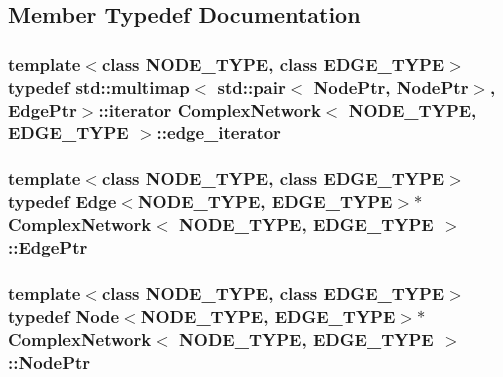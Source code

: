 \subsection{Member Typedef Documentation}
\hypertarget{class_complex_network_af5db8f579c2622ec27f2cfb6835d8466}{
\subsubsection[{edge\+\_\+iterator}]{\setlength{\rightskip}{0pt plus 5cm}template$<$class N\+O\+D\+E\+\_\+\+T\+Y\+P\+E, class E\+D\+G\+E\+\_\+\+T\+Y\+P\+E$>$ typedef std\+::multimap$<$ std\+::pair$<$ {\bf Node\+Ptr}, {\bf Node\+Ptr}$>$, {\bf Edge\+Ptr}$>$\+::iterator {\bf Complex\+Network}$<$ N\+O\+D\+E\+\_\+\+T\+Y\+P\+E, E\+D\+G\+E\+\_\+\+T\+Y\+P\+E $>$\+::{\bf edge\+\_\+iterator}\hspace{0.3cm}{\ttfamily [private]}}}\label{class_complex_network_af5db8f579c2622ec27f2cfb6835d8466}
\hypertarget{class_complex_network_af07ec30729e69a40c4c5ac2e98381206}{
\subsubsection[{Edge\+Ptr}]{\setlength{\rightskip}{0pt plus 5cm}template$<$class N\+O\+D\+E\+\_\+\+T\+Y\+P\+E, class E\+D\+G\+E\+\_\+\+T\+Y\+P\+E$>$ typedef {\bf Edge}$<$N\+O\+D\+E\+\_\+\+T\+Y\+P\+E, E\+D\+G\+E\+\_\+\+T\+Y\+P\+E$>$$\ast$ {\bf Complex\+Network}$<$ N\+O\+D\+E\+\_\+\+T\+Y\+P\+E, E\+D\+G\+E\+\_\+\+T\+Y\+P\+E $>$\+::{\bf Edge\+Ptr}\hspace{0.3cm}{\ttfamily [private]}}}\label{class_complex_network_af07ec30729e69a40c4c5ac2e98381206}
\hypertarget{class_complex_network_a1a0d11ddc5f0c146a0e921b58bb5eb3e}{
\subsubsection[{Node\+Ptr}]{\setlength{\rightskip}{0pt plus 5cm}template$<$class N\+O\+D\+E\+\_\+\+T\+Y\+P\+E, class E\+D\+G\+E\+\_\+\+T\+Y\+P\+E$>$ typedef {\bf Node}$<$N\+O\+D\+E\+\_\+\+T\+Y\+P\+E, E\+D\+G\+E\+\_\+\+T\+Y\+P\+E$>$$\ast$ {\bf Complex\+Network}$<$ N\+O\+D\+E\+\_\+\+T\+Y\+P\+E, E\+D\+G\+E\+\_\+\+T\+Y\+P\+E $>$\+::{\bf Node\+Ptr}\hspace{0.3cm}{\ttfamily [private]}}}\label{class_complex_network_a1a0d11ddc5f0c146a0e921b58bb5eb3e}


